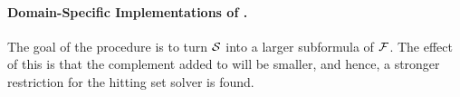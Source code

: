 


\paragraph{Domain-Specific Implementations of \grow.} \label{para:domainspecificgrow}

The goal of the \grow procedure is to turn $\mathcal{S}$ into a larger subformula of $\mathcal{F} $. The effect of this is that the complement added to \setstohit will be smaller, and hence, a stronger restriction for the hitting set solver is found.  

